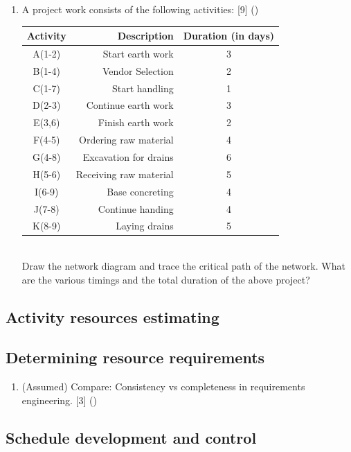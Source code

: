 \documentclass[12pt]{article}
\begin{document}
\begin{enumerate}
      \item A project work consists of the following activities: \hfill [9] ()\\
        \begin{tabular}{|c|r|c|}
          \hline
          Activity & Description & Duration (in days) \\ \hline
          A(1-2) & Start earth work & 3 \\ \hline
          B(1-4) & Vendor Selection & 2 \\ \hline
          C(1-7) & Start handling & 1 \\ \hline
          D(2-3) & Continue earth work & 3 \\ \hline
          E(3,6) & Finish earth work & 2 \\ \hline
          F(4-5) & Ordering raw material & 4 \\ \hline
          G(4-8) & Excavation for drains & 6 \\ \hline
          H(5-6) & Receiving raw material & 5 \\ \hline
          I(6-9) & Base concreting & 4 \\ \hline
          J(7-8) & Continue handing & 4 \\ \hline
          K(8-9) & Laying drains & 5 \\ \hline
        \end{tabular}\\
        Draw the network diagram and trace the critical path of the network. What are the various timings and the total duration of the above project?
    \end{enumerate}

  \subsection{Activity resources estimating}
  \subsection{Determining resource requirements}
    \begin{enumerate}
      \item (Assumed) Compare: Consistency vs completeness in requirements engineering. \hfill [3] ()
    \end{enumerate}

  \subsection{Schedule development and control}
\end{document}
